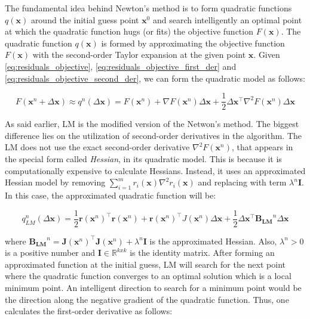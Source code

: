 \documentclass[a4paper]{report}
\numberwithin{figure}{section}
\newcommand{\R}{\mathbb{R}}
\begin{document}
\begin{appendices}
The fundamental idea behind Newton's method is to form quadratic functions 
$q(\mathbf{x})$ 
around the initial guess point $\mathbf{x}^0$ and search intelligently an optimal point at which 
the quadratic function hugs (or fits) the objective function $F(\mathbf{x})$. 
The quadratic function $q(\mathbf{x})$ is formed by approximating the objective function $F(\mathbf{x})$ 
with the second-order Taylor expansion at the given point $\mathbf{x}$.
Given 
\eqref{eq:residuals_objective}, 
\eqref{eq:residuals_objective_first_der} and 
\eqref{eq:residuals_objective_second_der}, 
we can form the quadratic model as follows:

\begin{equation}
  F(\mathbf{x}^n + \Delta \mathbf{x}) \approx
  q^n(\Delta \mathbf{x}) = 
  F(\mathbf{x}^n) + 
  \nabla F(\mathbf{x}^n) \Delta \mathbf{x} + 
  \frac{1}{2}\Delta \mathbf{x}^\top \nabla^2 F(\mathbf{x}^n) \Delta 
  \mathbf{x}
\end{equation}


As said earlier, LM is the modified version of the Netwon's method. 
The biggest difference lies on the utilization of second-order derivatives 
in the algorithm. 
The LM does not use the exact 
second-order derivative $\nabla^2F(\mathbf{x}^n)$, that appears in the special form called \textit{Hessian}, 
in its quadratic model. 
This is because it is computationally expensive to calculate Hessians. 
Instead, it uses an approximated 
Hessian model by removing $\sum_{i=1}^mr_i(\mathbf{x})\nabla^2r_i(\mathbf{x})$ 
and replacing with 
term $\lambda^n \mathbf{I}$. In this case, the approximated quadratic function will be:

\begin{equation}
  q_{LM}^n(\Delta \mathbf{x}) = 
  \frac{1}{2}\mathbf{r}(\mathbf{x}^n)^\top\mathbf{r}(\mathbf{x}^n) + 
  \mathbf{r}(\mathbf{x}^n)^\top J(\mathbf{x}^n)\Delta \mathbf{x} + 
  \frac{1}{2}\Delta \mathbf{x}^\top\mathbf{B_{LM}}^n\Delta \mathbf{x}
\end{equation}

where 
$
\mathbf{B_{LM}}^n = \mathbf{J}(\mathbf{x}^n)^\top 
\mathbf{J}(\mathbf{x}^n) + 
\lambda^n \mathbf{I}
$ 
is the approximated Hessian. Also, 
$\lambda^n>0$ is a positive number and $\mathbf{I}\in \R^{kxk}$ is the identity matrix.
After forming an approximated function at the initial guess, LM 
will search for the next point where the quadratic function converges to an  
optimal solution which is a local minimum point. An intelligent direction  
to search for a minimum point would be the direction along  
the negative gradient of the quadratic function. 
Thus, one calculates the first-order derivative as follows:


\end{appendices}
\end{document}
